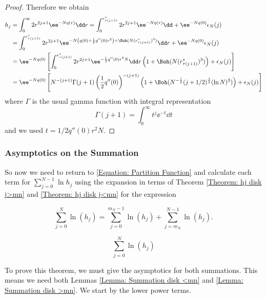 \begin{proof}
Therefore we obtain
\begin{align}
	h_j & = \int_{0}^{\infty} 2r^{2j+1} \ee^{-N q(r)} \dd r = \int_{0}^{r^*_{\tau(j+1)}} 2r^{2j+1} \ee^{-N q(r)} \dd + \ee^{-N q(0)} \epsilon_N(j) \\
	& = \int_{0}^{r^*_{\tau(j+1)}} 2r^{2j+1} \ee^{-N \left( q(0) + \frac{1}{2} q''(0) r^2 \right) + \Boh(N(r^*_{\tau(j+1)})^3)} \dd  r + \ee^{-N q(0)} \epsilon_N(j) \\
	& =  \ee^{-N q(0)} \left[ \int_{0}^{r^*_{\tau(j+1)}} 2r^{2j+1} \ee^{-\frac{1}{2} q''(0) r^2 N} \dd r \left( 1 + \Boh(N(r^*_{\tau(j+1)})^3) \right)+ \epsilon_N(j) \right] \\
	&=  \ee^{-N q(0)} \left[ N^{-(j+1)} \Gamma(j+1)\left(\frac{1}{2} q''(0)\right)^{-(j+1)} \left( 1 + \Boh(N^{-\frac{1}{2}} (j+1/2)^{\frac{3}{2}} (\ln N)^3) \right)+ \epsilon_N(j) \right]
\end{align}
where $\Gamma$ is the usual gamma function with integral representation
\begin{equation}
	\Gamma(j+1) = \int_{0}^{\infty} t^j \ee^{-t} \dd t
\end{equation}
and we used $t = 1/2 q''(0) r^2 N$.
  
\end{proof}

\subsubsection{Asymptotics on the Summation}

So now we need to return to  \eqref{Equation: Partition Function} and calculate each term for $	\sum_{j=0}^{N-1} \ln{h_j}$ using the expansion in terms of Theorem \ref{Theorem: hj disk j>mn} and \ref{Theorem: hj disk j<mn} for the expression

\begin{equation}
	\sum_{j=0}^{N} \ln(h_j) = \sum_{j=0}^{m_N - 1} \ln(h_j)  + \sum_{j=m_N}^{N - 1} \ln(h_j).
\end{equation}

\begin{teorema}
	\begin{equation}
		\sum_{j=0}^{N} \ln(h_j)
	\end{equation}
\end{teorema}

To prove this theorem, we must give the asymptotics for both summations. This means we need both Lemmas \ref{Lemma: Summation disk <mn} and \ref{Lemma: Summation disk >mn}. We start by the lower power terms.

